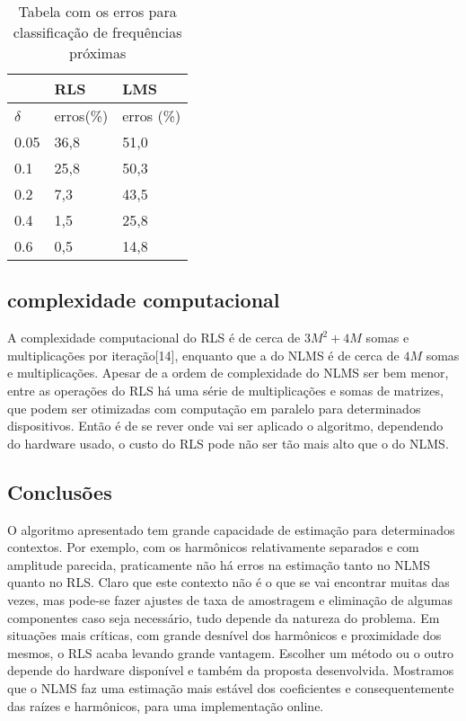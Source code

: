 \documentclass[a4paper, 12pt]{book}
\begin{document}
\begin{table}[h]
	\centering
\begin{tabular}{|l|l|l|}
	\hline
	& RLS   & LMS        \\ \hline
	$\delta$ & erros(\%) & erros (\%) \\ \hline
	0.05  & 36,8  & 51,0       \\ \hline
	0.1   & 25,8  & 50,3       \\ \hline
	0.2   & 7,3   & 43,5       \\ \hline
	0.4   & 1,5   & 25,8       \\ \hline
	0.6   & 0,5   & 14,8       \\ \hline
	\end{tabular}
\caption{Tabela com os erros para classificação de frequências próximas}
\label{tab:tab_freq}
\end{table}

\subsection{complexidade computacional}

A complexidade computacional do RLS é de cerca de $3M^2 + 4M$ somas e multiplicações por iteração[14], enquanto que a do NLMS é de cerca de $4M$ somas e multiplicações. Apesar de a ordem de complexidade do NLMS ser bem menor, entre as operações do RLS há uma série de multiplicações e somas de matrizes, que podem ser otimizadas com computação em paralelo para determinados dispositivos. Então é de se rever onde vai ser aplicado o algoritmo, dependendo do hardware usado, o custo do RLS pode não ser tão mais alto que o do NLMS.

\subsection{Conclusões}
O algoritmo apresentado tem grande capacidade de estimação para determinados contextos. Por exemplo, com os harmônicos relativamente separados e com amplitude parecida, praticamente não há erros na estimação tanto no NLMS quanto no RLS. Claro que este contexto não é o que se vai encontrar muitas das vezes, mas pode-se fazer ajustes de taxa de amostragem e eliminação de algumas componentes caso seja necessário, tudo depende da natureza do problema. Em situações mais críticas, com grande desnível dos harmônicos e proximidade dos mesmos, o RLS acaba levando grande vantagem. Escolher um método ou o outro depende do hardware disponível e também da proposta desenvolvida. Mostramos que o NLMS faz uma estimação mais estável dos coeficientes e consequentemente das raízes e harmônicos, para uma implementação online.
\end{document}
